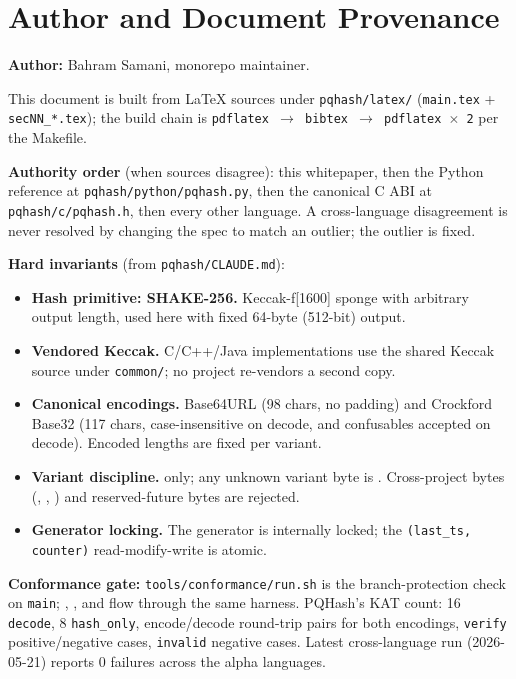 \section{Author and Document Provenance}
\label{sec:appendix-provenance}

\textbf{Author:} Bahram Samani, \pqtoolkit{} monorepo maintainer.

This document is built from LaTeX sources under \texttt{pqhash/latex/} (\texttt{main.tex} + \texttt{secNN\_*.tex}); the build chain is \texttt{pdflatex $\rightarrow$ bibtex $\rightarrow$ pdflatex $\times$ 2} per the Makefile.

\textbf{Authority order} (when sources disagree): this whitepaper, then the Python reference at \texttt{pqhash/python/pqhash.py}, then the canonical C ABI at \texttt{pqhash/c/pqhash.h}, then every other language. A cross-language disagreement is never resolved by changing the spec to match an outlier; the outlier is fixed.

\textbf{Hard invariants} (from \texttt{pqhash/CLAUDE.md}):

\begin{itemize}
\item \textbf{Hash primitive: SHAKE-256.} Keccak-f[1600] sponge with arbitrary output length, used here with fixed 64-byte (512-bit) output.
\item \textbf{Vendored Keccak.} C/C++/Java implementations use the shared Keccak source under \texttt{common/}; no project re-vendors a second copy.
\item \textbf{Canonical encodings.} Base64URL (98 chars, no padding) and Crockford Base32 (117 chars, case-insensitive on decode,  and  confusables accepted on decode). Encoded lengths are fixed per variant.
\item \textbf{Variant discipline.}  only; any unknown variant byte is . Cross-project bytes (, , ) and reserved-future bytes are rejected.
\item \textbf{Generator locking.} The generator is internally locked; the \texttt{(last\_ts, counter)} read-modify-write is atomic.
\end{itemize}

\textbf{Conformance gate:} \texttt{tools/conformance/run.sh} is the branch-protection check on \texttt{main}; \pqid{}, \pqhash{}, and \pqcrypt{} flow through the same harness. PQHash's KAT count: 16 \texttt{decode}, 8 \texttt{hash\_only}, encode/decode round-trip pairs for both encodings, \texttt{verify} positive/negative cases, \texttt{invalid} negative cases. Latest cross-language run (2026-05-21) reports 0 failures across the alpha languages.

